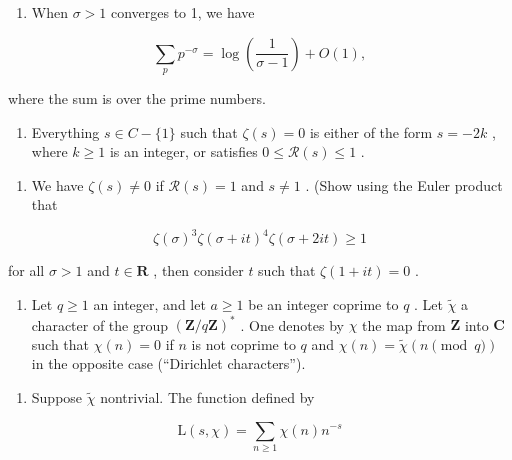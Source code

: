 \begin{enumerate}
\def\labelenumi{\alph{enumi})}
\setcounter{enumi}{7}
\tightlist
\item
  When \(\sigma > 1\) converges to 1, we have
\end{enumerate}

\[
\sum_ {p} p ^ {- \sigma} = \log \left(\frac {1}{\sigma - 1}\right) + O (1),
\]

where the sum is over the prime numbers.

\begin{enumerate}
\def\labelenumi{\roman{enumi})}
\tightlist
\item
  Everything \(s \in C - \{1\}\) such that \(\zeta(s) = 0\) is either of the form \(s = -2k\) , where \(k \geqslant 1\) is an integer, or satisfies \(0 \leqslant \mathcal{R}(s) \leqslant 1\) .
\end{enumerate}

\begin{enumerate}
\def\labelenumi{\alph{enumi})}
\setcounter{enumi}{9}
\tightlist
\item
  We have \(\zeta(s) \neq 0\) if \(\mathcal{R}(s) = 1\) and \(s \neq 1\) . (Show using the Euler product that
\end{enumerate}

\[
\zeta (\sigma) ^ {3} \zeta (\sigma + i t) ^ {4} \zeta (\sigma + 2 i t) \geqslant 1
\]

for all \(\sigma > 1\) and \(t \in \mathbf{R}\) , then consider \(t\) such that \(\zeta(1 + it) = 0\) .

\begin{enumerate}
\def\labelenumi{\arabic{enumi})}
\setcounter{enumi}{16}
\tightlist
\item
  Let \(q \geqslant 1\) an integer, and let \(a \geqslant 1\) be an integer coprime to \(q\) . Let \(\widetilde{\chi}\) a character of the group \((\mathbf{Z}/q\mathbf{Z})^*\) . One denotes by \(\chi\) the map from \(\mathbf{Z}\) into \(\mathbf{C}\) such that \(\chi(n) = 0\) if \(n\) is not coprime to \(q\) and \(\chi(n) = \widetilde{\chi}(n \pmod{q})\) in the opposite case (“Dirichlet characters”).
\end{enumerate}

\begin{enumerate}
\def\labelenumi{\alph{enumi})}
\tightlist
\item
  Suppose \(\widetilde{\chi}\) nontrivial. The function defined by
\end{enumerate}

\[
\mathrm{L} (s, \chi) = \sum_ {n \geqslant 1} \chi (n) n ^ {- s}
\]


